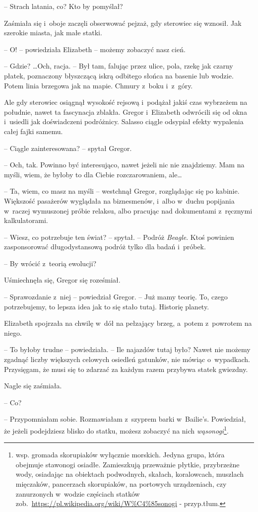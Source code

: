 \documentclass[oneside,polish,12pt,sfheadings]{mwbk}
\begin{document}
-- Strach latania, co? Kto by pomyślał?

Zaśmiała się i~oboje zaczęli obserwować pejzaż, gdy sterowiec się
wznosił. Jak szerokie miasta, jak małe statki.

-- O! -- powiedziała Elizabeth -- możemy zobaczyć nasz cień.

-- Gdzie? \ldots Och, racja. -- Był tam, falując przez ulice, pola, rzekę
jak czarny płatek, poznaczony błyszczącą iskrą odbitego słońca na
basenie lub wodzie. Potem linia brzegowa jak na mapie. Chmury z~boku i~z~góry.

Ale gdy sterowiec osiągnął wysokość rejsową i~podążał jakiś czas
wybrzeżem na południe, nawet ta fascynacja zblakła. Gregor i~Elizabeth
odwrócili się od okna i~usiedli jak doświadczeni podróżnicy. Salasso
ciągle odsypiał efekty wypalenia całej fajki samemu.

-- Ciągle zainteresowana? -- spytał Gregor.

-- Och, tak. Powinno być interesująco, nawet jeżeli nic nie znajdziemy.
Mam na myśli, wiem, że byłoby to dla Ciebie rozczarowaniem, ale\ldots

-- Ta, wiem, co masz na myśli -- westchnął Gregor, rozglądając się po
kabinie. Większość pasażerów wyglądała na biznesmenów, i~albo w~duchu
popijania w~raczej wymuszonej próbie relaksu, albo pracując nad
dokumentami z~ręcznymi kalkulatorami.

-- Wiesz, co potrzebuje ten świat? -- spytał. -- Podróż \emph{Beagle}. Ktoś
powinien zasponsorować długodystansową podróż tylko dla badań i~próbek.

-- By wrócić z~teorią ewolucji?

Uśmiechnęła się, Gregor się roześmiał.

-- Sprawozdanie z~niej -- powiedział Gregor. -- Już mamy teorię. To, czego
potrzebujemy, to lepsza idea jak to się stało tutaj. Historię planety.

Elizabeth spojrzała na chwilę w~dół na pełzający brzeg, a~potem z~powrotem na niego.

-- To byłoby trudne -- powiedziała. -- Ile najazdów tutaj było? Nawet nie
możemy zgadnąć liczby większych celowych osiedleń gatunków, nie mówiąc o~wypadkach. Przysięgam, że musi się to zdarzać za każdym razem przybywa
statek gwiezdny.

Nagle się zaśmiała.

-- Co?

-- Przypomniałam sobie. Rozmawiałam z~szyprem barki w~Bailie's.
Powiedział, że jeżeli podejdziesz blisko do statku, możesz zobaczyć na
nich \emph{wąsonogi}\footnote{wsp. gromada skorupiaków
wyłącznie morskich. Jedyna grupa, która obejmuje stawonogi osiadłe.
Zamieszkują przeważnie płytkie, przybrzeżne wody, osiadając na obiektach
podwodnych, skałach, koralowcach, muszlach mięczaków, pancerzach
skorupiaków, na portowych urządzeniach, czy zanurzonych w~wodzie
częściach statków zob.~\url{https://pl.wikipedia.org/wiki/W\%C4\%85sonogi} -
przyp.tłum.}.
\end{document}

